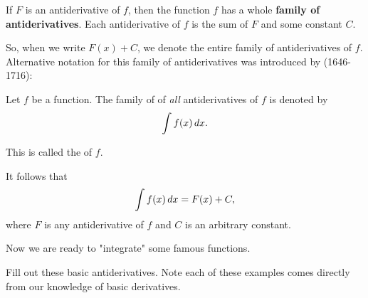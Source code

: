 \documentclass{ximera}
\begin{document}
\begin{theorem}\label{theorem:FOA}

If $F$ is an antiderivative of $f$, then the function $f$ has a whole \textbf{family of antiderivatives}. Each antiderivative of $f$ is the sum of $F$ and some constant $C$.
\end{theorem}

So, when we write $F(x)+C$, we denote the entire family of
antiderivatives of $f$.  Alternative notation for this family of
antiderivatives was introduced by  (1646-1716):

\begin{definition}
Let $f$ be a function. The family of of \emph{all} antiderivatives of $f$ is denoted by
\[
\int f(x) \mathop{}\!d x.
\]

This is called the
 of $f$.
\end{definition}
It follows that
\[
\int f(x) \mathop{}\!d x =F(x)+C,
\]
where $F$ is any antiderivative of $f$ and $C$ is an arbitrary constant.

Now we are ready to "integrate" some famous functions.


Fill out these basic antiderivatives. Note each of these examples comes
directly from our knowledge of basic derivatives.
\end{document}
